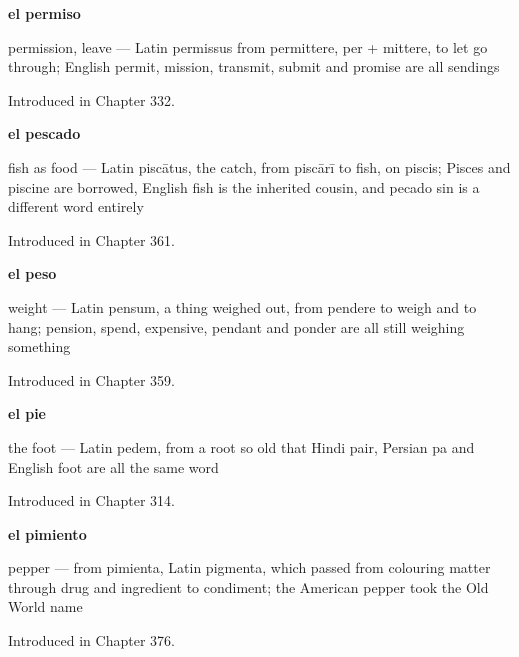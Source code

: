 \noindent\begin{minipage}[t]{\linewidth}
\raggedright
\textbf{el permiso}\par
\small permission, leave — Latin permissus from permittere, per + mittere, to let go through; English permit, mission, transmit, submit and promise are all sendings\par
\footnotesize Introduced in Chapter 332.
\end{minipage}\par\medskip

\noindent\begin{minipage}[t]{\linewidth}
\raggedright
\textbf{el pescado}\par
\small fish as food — Latin piscātus, the catch, from piscārī to fish, on piscis; Pisces and piscine are borrowed, English fish is the inherited cousin, and pecado sin is a different word entirely\par
\footnotesize Introduced in Chapter 361.
\end{minipage}\par\medskip

\noindent\begin{minipage}[t]{\linewidth}
\raggedright
\textbf{el peso}\par
\small weight — Latin pensum, a thing weighed out, from pendere to weigh and to hang; pension, spend, expensive, pendant and ponder are all still weighing something\par
\footnotesize Introduced in Chapter 359.
\end{minipage}\par\medskip

\noindent\begin{minipage}[t]{\linewidth}
\raggedright
\textbf{el pie}\par
\small the foot — Latin pedem, from a root so old that Hindi pair, Persian pa and English foot are all the same word\par
\footnotesize Introduced in Chapter 314.
\end{minipage}\par\medskip

\noindent\begin{minipage}[t]{\linewidth}
\raggedright
\textbf{el pimiento}\par
\small pepper — from pimienta, Latin pigmenta, which passed from colouring matter through drug and ingredient to condiment; the American pepper took the Old World name\par
\footnotesize Introduced in Chapter 376.
\end{minipage}\par\medskip

